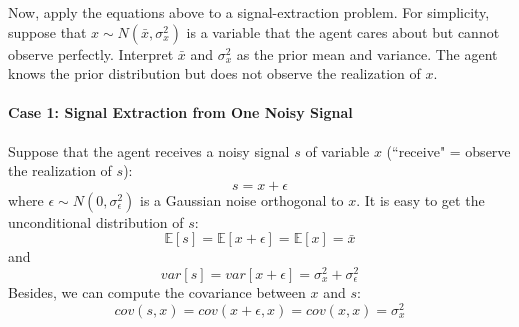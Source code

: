 \documentclass[12pt]{article}
\begin{document}
Now, apply the equations above to a signal-extraction problem. For simplicity, suppose that $x \sim N(\bar{x}, \sigma_x^2)$ is a variable that the agent cares about but cannot observe perfectly. Interpret $\bar{x}$ and $\sigma_x^2$ as the prior mean and variance. The agent knows the prior distribution but does not observe the realization of $x$.

\paragraph{Case 1: Signal Extraction from One Noisy Signal  \\ [6pt]}
Suppose that the agent receives a noisy signal $s$ of variable $x$ (``receive" = observe the realization of $s$):
\begin{equation}
	s = x + \epsilon
\end{equation}
where $\epsilon \sim N(0,\sigma_{\epsilon}^2)$ is a Gaussian noise orthogonal to $x$. It is easy to get the unconditional distribution of $s$: 
\begin{equation}
	\mathbb{E}[s] = \mathbb{E}[x+\epsilon] = \mathbb{E}[x] = \bar{x} 
\end{equation}
and
\begin{equation}
	var[s] = var[x + \epsilon] = \sigma_x^2 + \sigma_\epsilon^2
\end{equation}
Besides, we can compute the covariance between $x$ and $s$:
\begin{equation}
	cov(s,x) = cov(x+ \epsilon, x) = cov(x,x) = \sigma^2_x
\end{equation}
\end{document}
